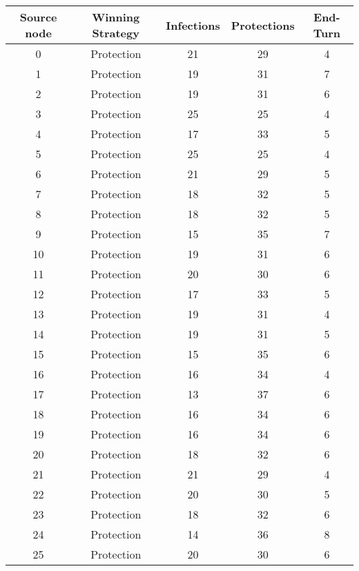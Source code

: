 \documentclass[results.tex]{subfiles}
\begin{document}
\begin{center}
  \begin{tabular}{| c || c | c | c | c |}
    \hline
    {\bfseries Source node} & {\bfseries Winning Strategy} & {\bfseries Infections} & {\bfseries Protections} & {\bfseries End-Turn} \\  %
    \hline\hline
    0 & Protection & 21 & 29 & 4 \\ 
    \hline
    1 & Protection & 19 & 31 & 7 \\ 
    \hline
    2 & Protection & 19 & 31 & 6 \\ 
    \hline
    3 & Protection & 25 & 25 & 4 \\ 
    \hline
    4 & Protection & 17 & 33 & 5 \\ 
    \hline
    5 & Protection & 25 & 25 & 4 \\ 
    \hline
    6 & Protection & 21 & 29 & 5 \\ 
    \hline
    7 & Protection & 18 & 32 & 5 \\ 
    \hline
    8 & Protection & 18 & 32 & 5 \\ 
    \hline
    9 & Protection & 15 & 35 & 7 \\ 
    \hline
    10 & Protection & 19 & 31 & 6 \\ 
    \hline
    11 & Protection & 20 & 30 & 6 \\ 
    \hline
    12 & Protection & 17 & 33 & 5 \\ 
    \hline
    13 & Protection & 19 & 31 & 4 \\ 
    \hline
    14 & Protection & 19 & 31 & 5 \\ 
    \hline
    15 & Protection & 15 & 35 & 6 \\ 
    \hline
    16 & Protection & 16 & 34 & 4 \\ 
    \hline
    17 & Protection & 13 & 37 & 6 \\ 
    \hline
    18 & Protection & 16 & 34 & 6 \\ 
    \hline
    19 & Protection & 16 & 34 & 6 \\ 
    \hline
    20 & Protection & 18 & 32 & 6 \\ 
    \hline
    21 & Protection & 21 & 29 & 4 \\ 
    \hline
    22 & Protection & 20 & 30 & 5 \\ 
    \hline
    23 & Protection & 18 & 32 & 6 \\ 
    \hline
    24 & Protection & 14 & 36 & 8 \\ 
    \hline
    25 & Protection & 20 & 30 & 6 \\ 

\end{tabular}
\end{center}
\end{document}

